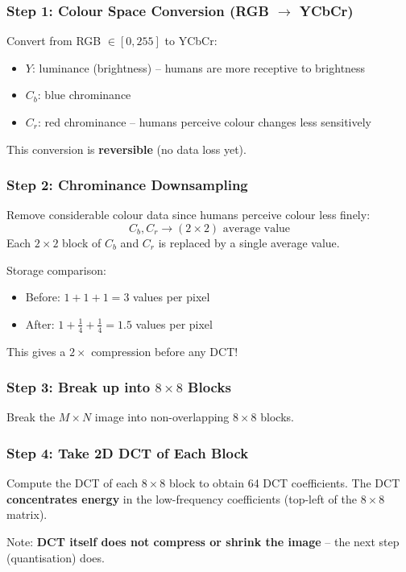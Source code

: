 \documentclass[12pt,a4paper]{article}
\begin{document}
\subsubsection{Step 1: Colour Space Conversion (RGB $\to$ YCbCr)}

Convert from RGB $\in [0,255]$ to YCbCr:
\begin{itemize}
  \item $Y$: luminance (brightness) -- humans are more receptive to brightness
  \item $C_b$: blue chrominance
  \item $C_r$: red chrominance -- humans perceive colour changes less sensitively
\end{itemize}
This conversion is \textbf{reversible} (no data loss yet).

\subsubsection{Step 2: Chrominance Downsampling}

Remove considerable colour data since humans perceive colour less finely:
\[
C_b, C_r \to (2\times2)\text{ average value}
\]
Each $2\times2$ block of $C_b$ and $C_r$ is replaced by a single average value.

Storage comparison:
\begin{itemize}
  \item Before: $1 + 1 + 1 = 3$ values per pixel
  \item After: $1 + \frac{1}{4} + \frac{1}{4} = 1.5$ values per pixel
\end{itemize}
This gives a $2\times$ compression before any DCT!

\subsubsection{Step 3: Break up into $8\times8$ Blocks}

Break the $M\times N$ image into non-overlapping $8\times8$ blocks.

\subsubsection{Step 4: Take 2D DCT of Each Block}

Compute the DCT of each $8\times8$ block to obtain 64 DCT coefficients. The DCT \textbf{concentrates energy} in the low-frequency coefficients (top-left of the $8\times8$ matrix).

Note: \textbf{DCT itself does not compress or shrink the image} -- the next step (quantisation) does.
\end{document}
